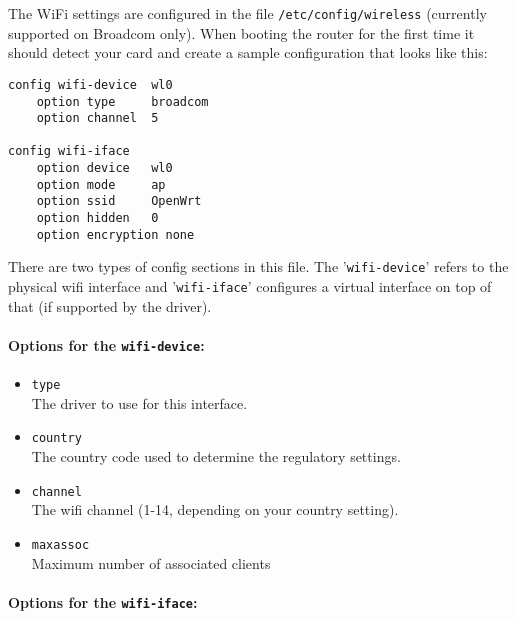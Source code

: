 The WiFi settings are configured in the file \texttt{/etc/config/wireless}
(currently supported on Broadcom only). When booting the router for the first time
it should detect your card and create a sample configuration that looks like this:

\begin{Verbatim}
config wifi-device  wl0
    option type     broadcom
    option channel  5

config wifi-iface
    option device   wl0
    option mode     ap
    option ssid     OpenWrt
    option hidden   0
    option encryption none
\end{Verbatim}

There are two types of config sections in this file. The '\texttt{wifi-device}' refers to
the physical wifi interface and '\texttt{wifi-iface}' configures a virtual interface on top
of that (if supported by the driver).

\paragraph{Options for the \texttt{wifi-device}:}

\begin{itemize}
	\item \texttt{type} \\
		The driver to use for this interface.
	
	\item \texttt{country} \\
		The country code used to determine the regulatory settings.
	
	\item \texttt{channel} \\
		The wifi channel (1-14, depending on your country setting).

	\item \texttt{maxassoc} \\
		Maximum number of associated clients

\end{itemize}

\paragraph{Options for the \texttt{wifi-iface}:}


